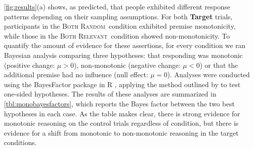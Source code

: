 \documentclass[doc,12pt]{apa}
\newcommand{\relevant}{\textsc{Both Relevant}}
\newcommand{\random}{\textsc{Both Random}}
\begin{document}

\cref{fig:results}(a) shows, as predicted, that people exhibited different response patterns depending on their sampling assumptions. For both {\bf Target} trials, participants in the \random\ condition exhibited premise monotonicity, while those in the \relevant\ condition showed non-monotonicity.
To quantify the amount of evidence for these assertions, for every condition we ran Bayesian analysis comparing three hypotheses: that responding was monotonic (positive change: $\mu>0$), non-monotonic (negative change: $\mu<0$) or that the additional premise had no influence (null effect: $\mu=0$). Analyses were conducted using the BayesFactor package in R \cite{MR14}, applying the method outlined by  to test one-sided hypotheses. The results of these analyses are summarized in \cref{tbl:monobayesfactors}, which reports the Bayes factor between the two best hypotheses in each case. As the table makes clear, there is strong evidence for monotonic reasoning on the control trials regardless of condition, but there is evidence for a shift from monotonic to non-monotonic reasoning in the target conditions.
\end{document}
